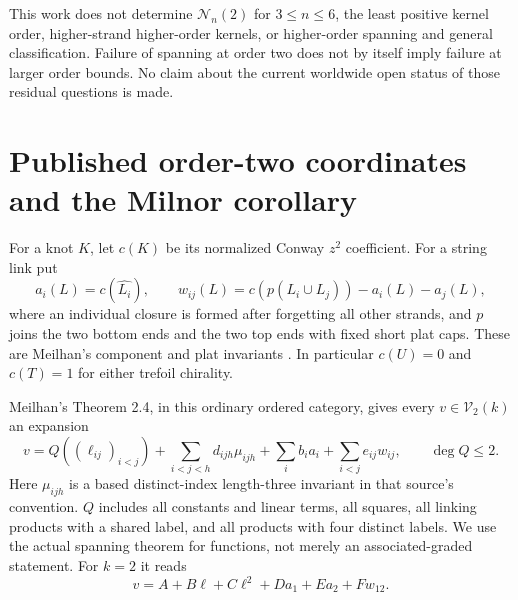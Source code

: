\documentclass[11pt]{article}
\theoremstyle{remark}\newtheorem{remark}[theorem]{Remark}
\newcommand{\V}{\mathcal V}
\newcommand{\N}{\mathcal N}
\begin{document}
This work does not determine $\N_n(2)$ for $3\leq n\leq6$, the least
positive kernel order, higher-strand higher-order kernels, or higher-order
spanning and general classification. Failure of spanning at order two
does not by itself imply failure at larger order bounds. No claim about
the current worldwide open status of those residual questions is made.

\section{Published order-two coordinates and the Milnor corollary}
For a knot $K$, let $c(K)$ be its normalized Conway $z^2$ coefficient.
For a string link put
\[
a_i(L)=c(\widehat{L_i}),\qquad
w_{ij}(L)=c(p(L_i\cup L_j))-a_i(L)-a_j(L),
\]
where an individual closure is formed after forgetting all other strands,
and $p$ joins the two bottom ends and the two top ends with fixed short
plat caps. These are Meilhan's component and plat invariants
\cite[\S2.1 and Proposition 2.1]{Meilhan}. In particular
$c(U)=0$ and $c(T)=1$ for either trefoil chirality.

Meilhan's Theorem 2.4, in this ordinary ordered category, gives every
$v\in\V_2(k)$ an expansion
\begin{equation}\label{eq:classification}
v=Q((\ell_{ij})_{i<j})+\sum_{i<j<h}d_{ijh}\mu_{ijh}
   +\sum_i b_i a_i+\sum_{i<j}e_{ij}w_{ij},\qquad \deg Q\leq2.
\end{equation}
Here $\mu_{ijh}$ is a based distinct-index length-three invariant in that
source's convention. $Q$ includes all constants and linear terms, all
squares, all linking products with a shared label, and all products with
four distinct labels. We use the actual spanning theorem for functions,
not merely an associated-graded statement. For $k=2$ it reads
\begin{equation}\label{eq:six}
v=A+B\ell+C\ell^2+D a_1+E a_2+F w_{12}.
\end{equation}
\end{document}
